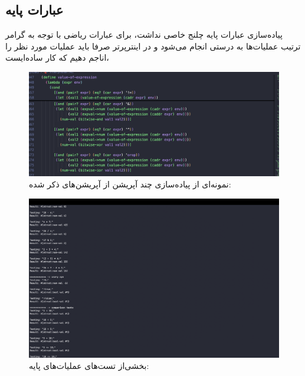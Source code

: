 \documentclass{article}
\begin{document}
\subsection{عبارات پایه}
پیاده‌سازی عبارات پایه چلنج خاصی نداشت، برای عبارات ریاضی با توجه به گرامر ترتیب عملیات‌ها به درستی انجام می‌شود و در اینترپرتر صرفا باید عملیات مورد نظر را اناجم دهیم که کار ساده‌ایست، 
\begin{figure}[h]
        \centering
        \includegraphics[width=0.5\linewidth]{pics/t1.png}
        \caption{نمونه‌ای از پیاده‌سازی چند آپریشن از آپریشن‌های ذکر شده:}
\end{figure}
\begin{figure}[h]
        \centering
        \includegraphics[width=0.5\linewidth]{pics/t2.png}
        \caption{بخشی‌از تست‌های عملیات‌های پایه:}
\end{figure}
\FloatBarrier
\end{document}
